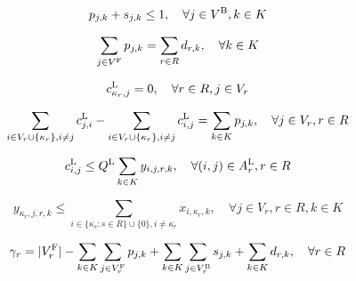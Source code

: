 \begin{linenomath}
    \begin{equation}
        p_{j,k} + s_{j,k} \leq 1, \quad \forall j \in V^{\text{B}}, k \in K \label{eq:exclusive_operations}
    \end{equation}
\end{linenomath}

\begin{linenomath}
    \begin{equation}
        \sum_{j \in V^{\text{F}}} p_{j,k} = \sum_{r \in R} d_{r,k}, \quad \forall k \in K \label{eq:functional_balance}
    \end{equation}
\end{linenomath}

\begin{linenomath}
    \begin{equation}
        c_{\kappa_r,j}^{\text{L}} = 0, \quad \forall r \in R, j \in V_r \label{eq:laborer_initial}
    \end{equation}
\end{linenomath}

\begin{linenomath}
    \begin{equation}
        \sum_{i \in V_r \cup \{\kappa_r\}, i \neq j} c_{j,i}^{\text{L}} - \sum_{i \in V_r \cup \{\kappa_r\}, i \neq j} c_{i,j}^{\text{L}} = \sum_{k \in K} p_{j,k}, \quad \forall j \in V_r, r \in R \label{eq:laborer_inventory}
    \end{equation}
\end{linenomath}

\begin{linenomath}
    \begin{equation}
        c_{i,j}^{\text{L}} \leq Q^{\text{L}} \sum_{k \in K} y_{i,j,r,k}, \quad \forall (i,j) \in A_r^{\text{L}}, r \in R \label{eq:laborer_capacity}
    \end{equation}
\end{linenomath}

\begin{linenomath}
    \begin{equation}
        y_{\kappa_r,j,r,k} \leq \sum_{i \in \{\kappa_s : s \in R\} \cup \{0\}, i \neq \kappa_r} x_{i,\kappa_r,k}, \quad \forall j \in V_r, r \in R, k \in K \label{eq:coordination}
    \end{equation}
\end{linenomath}

\begin{linenomath}
    \begin{equation}
        \gamma_r = |V_r^{\text{F}}| - \sum_{k \in K}\sum_{j \in V_r^{\text{F}}} p_{j,k} + \sum_{k \in K}\sum_{j \in V_r^{\text{B}}} s_{j,k} + \sum_{k \in K} d_{r,k}, \quad \forall r \in R \label{eq:regional_inventory}
    \end{equation}
\end{linenomath}

